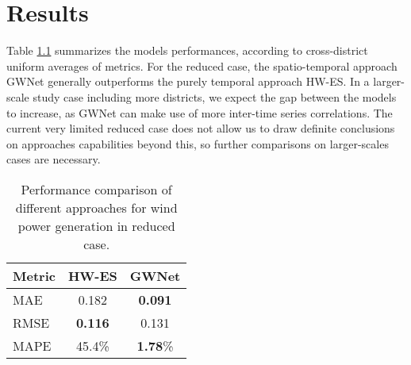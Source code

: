\chapter{Results}

Table \ref{tab:performances} summarizes the models performances, according to cross-district uniform averages of metrics.
For the reduced case, the spatio-temporal approach GWNet generally outperforms the purely temporal approach HW-ES.
In a larger-scale study case including more districts, we expect the gap between the models to increase, as GWNet can make use of more inter-time series correlations.
The current very limited reduced case does not allow us to draw definite conclusions on approaches capabilities beyond this, so further comparisons on larger-scales cases are necessary.

\begin{table}[H]
    \centering
    \caption{Performance comparison of different approaches for wind power generation in reduced case.}
    \label{tab:performances}
\begin{tabular}{l|cc}

\hline
\textbf{Metric} & \textbf{HW-ES} & \textbf{GWNet} \\ \hline
MAE             & 0.182          & \textbf{0.091}          \\
RMSE            & \textbf{0.116}          & 0.131          \\
MAPE            & 45.4\%         & \textbf{1.78}\%         \\ \hline
\end{tabular}
\end{table}


